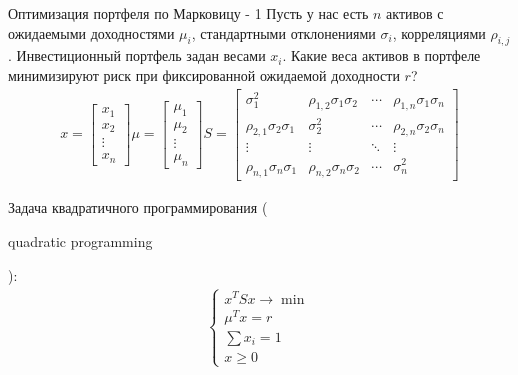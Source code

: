 \documentclass{beamer}
\newcommand{\en}[1]{\begin{otherlanguage}{english}#1\end{otherlanguage}}
\begin{document}
\begin{frame}{Оптимизация портфеля по Марковицу - 1}
\justify
Пусть у нас есть $n$ активов с ожидаемыми доходностями $\mu_i$, стандартными 
отклонениями $\sigma_i$, корреляциями $\rho_{i,j}$. Инвестиционный портфель 
задан весами $x_i$. Какие веса активов в портфеле минимизируют риск при 
фиксированной ожидаемой доходности $r$?
\begin{align*}
x = \begin{bmatrix}
x_1 \\
x_2 \\
\vdots \\
x_n
\end{bmatrix}
\mu = \begin{bmatrix}
\mu_1 \\
\mu_2 \\
\vdots \\
\mu_n
\end{bmatrix}
S = \begin{bmatrix}
\sigma_1^2 & \rho_{1,2}\sigma_1\sigma_2 & \cdots & \rho_{1,n}\sigma_1\sigma_n \\
\rho_{2,1}\sigma_2\sigma_1 & \sigma_2^2 & \cdots & \rho_{2,n}\sigma_2\sigma_n \\
\vdots & \vdots & \ddots & \vdots \\
\rho_{n,1}\sigma_n\sigma_1 & \rho_{n,2}\sigma_n\sigma_2 & \cdots & \sigma_n^2
\end{bmatrix}
\end{align*}

\justify
Задача квадратичного программирования (\en{quadratic programming}):
\begin{align*}
\begin{cases}
x^TS x \to \min \\
\mu^Tx = r \\
\sum x_i = 1 \\
x \ge 0
\end{cases}
\end{align*}
\end{frame}
\end{document}
